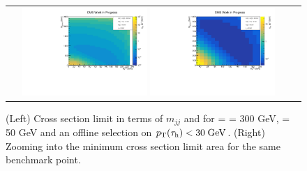 \begin{figure}[tbh!]
	\centering
	\begin{tabular}{cc}
		\includegraphics[width=0.45\textwidth]{analysis/pics/JetInvMass_vs_MET_xsec_chi300_lsp050_taupt30.pdf}
		\includegraphics[width=0.45\textwidth]{analysis/pics/JetInvMass_vs_MET_xsec_chi300_lsp050_taupt30_zoom.pdf} 		
	\end{tabular}
	\caption{(Left) Cross section limit in terms of $m_{jj}$ and \met for \charginopm = \neutralinotwo = 300 GeV, \neutralinoone = 50 GeV and an offline selection on $p_{\text{T}}(\tau_{\text{h}}) <  30\;\text{Ge}\kern-0.06667em\text{V}$. (Right) Zooming into the minimum cross section limit area for the same benchmark point.}
	\label{fig::JetInvMass_vs_MET_xsec_chi300_lsp050_taupt30}
\end{figure}

